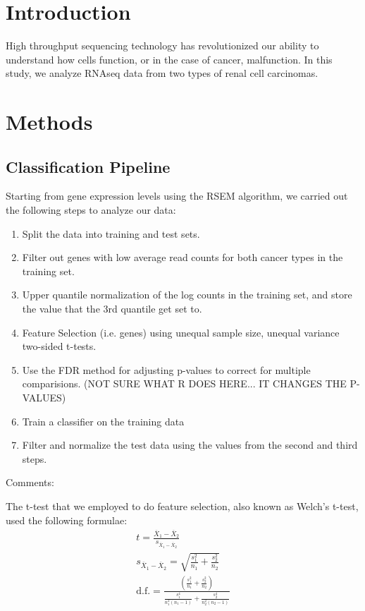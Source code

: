 \section{Introduction}
High throughput sequencing technology has revolutionized our ability to understand how cells function, or in the case of cancer, malfunction. In this study, we analyze RNAseq data from two types of renal cell carcinomas. 


\section{Methods}
\subsection{Classification Pipeline}
Starting from gene expression levels using the RSEM algorithm, we carried out the following steps to analyze our data:
\begin{enumerate}
\item Split the data into training and test sets. 
\item Filter out genes with low average read counts for both cancer types in the training set. 
\item Upper quantile normalization of the log counts in the training set, and store the value that the 3rd quantile get set to. 
\item Feature Selection (i.e. genes) using unequal sample size, unequal variance two-sided t-tests. 
\item Use the FDR method for adjusting p-values to correct for multiple comparisions. (NOT SURE WHAT R DOES HERE... IT CHANGES THE P-VALUES)
\item Train a classifier on the training data
\item Filter and normalize the test data using the values from the second and third steps. 
\end{enumerate}



Comments:

The t-test that we employed to do feature selection, also known as Welch's t-test, used the following formulae:
\begin{gather}
t = \frac{\overline{X}_1-\overline{X}_2}{s_{\overline{X}_1-\overline{X}_2}} \\
s_{\overline{X}_1-\overline{X}_2} = \sqrt{\frac{s_1^2}{n_1}+\frac{s_2^2}{n_2}} \\
\text{d.f.} = \frac{\left(\frac{s_1^2}{n_1}+\frac{s_2^2}{n_2} \right)}{\frac{s_1^4}{n_1^2(n_1-1)} + \frac{s_2^4}{n_2^2(n_2-1)}}
\end{gather}

